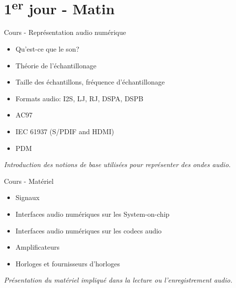 \documentclass[a4paper,12pt,obeyspaces,spaces,hyphens]{article}
\begin{document}
\feshowtitle

\feshowinfo

\section{1\textsuperscript{er} jour - Matin}

\feagendatwocolumn
{Cours - Représentation audio numérique}
{
  \begin{itemize}
  \item Qu'est-ce que le son?
  \item Théorie de l'échantillonage
  \item Taille des échantillons, fréquence d'échantillonage
  \item Formats audio: I2S, LJ, RJ, DSPA, DSPB
  \item AC97
  \item IEC 61937 (S/PDIF and HDMI)
  \item PDM
  \end{itemize}
  \vspace{0.5em}
  {\em Introduction des notions de base utilisées pour représenter des ondes audio.}
}
{Cours - Matériel}
{
  \begin{itemize}
  \item Signaux
  \item Interfaces audio numériques sur les System-on-chip
  \item Interfaces audio numériques sur les codecs audio
  \item Amplificateurs
  \item Horloges et fournisseurs d'horloges
  \end{itemize}
  \vspace{0.5em}
  {\em Présentation du matériel impliqué dans la lecture ou l'enregistrement audio.}
}
\end{document}
